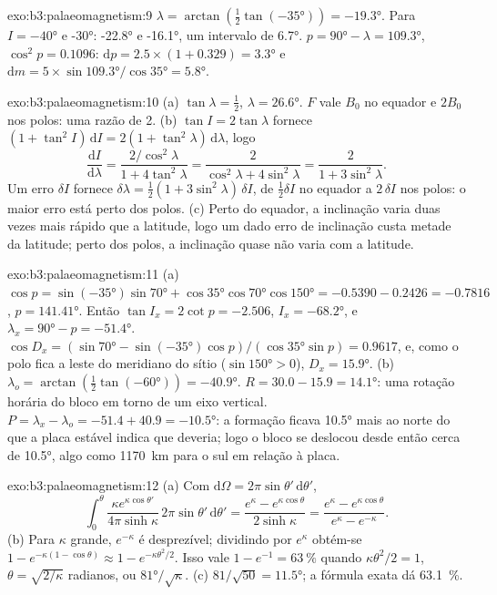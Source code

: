 \begin{solution}{exo:b3:palaeomagnetism:9}
$\lambda = \arctan(\tfrac12\tan(\ang{-35})) = \ang{-19.3}$. Para $I = \ang{-40}$
e \ang{-30}: \ang{-22.8} e \ang{-16.1}, um intervalo de \ang{6.7}.
$p = \ang{90} - \lambda = \ang{109.3}$, $\cos^2p = 0.1096$:
$\mathrm dp = 2.5\times(1 + 0.329) = \ang{3.3}$ e $\mathrm dm =
5\times\sin\ang{109.3}/\cos\ang{35} = \ang{5.8}$.
\end{solution}

\begin{solution}{exo:b3:palaeomagnetism:10}
(a) $\tan\lambda = \tfrac12$, $\lambda = \ang{26.6}$. $F$ vale $B_0$ no
equador e $2B_0$ nos polos: uma razão de 2. (b) $\tan I = 2\tan\lambda$
fornece $(1 + \tan^2I)\,\mathrm dI = 2(1 + \tan^2\lambda)\,\mathrm d\lambda$, logo
\[
  \frac{\mathrm dI}{\mathrm d\lambda} = \frac{2/\cos^2\lambda}{1 + 4\tan^2\lambda}
  = \frac{2}{\cos^2\lambda + 4\sin^2\lambda} = \frac{2}{1 + 3\sin^2\lambda}.
\]
Um erro $\delta I$ fornece $\delta\lambda = \tfrac12(1 + 3\sin^2\lambda)\,\delta I$,
de $\tfrac12\delta I$ no equador a $2\,\delta I$ nos polos: o
maior erro está perto dos polos. (c) Perto do equador, a inclinação varia
duas vezes mais rápido que a latitude, logo um dado erro de inclinação custa metade
da latitude; perto dos polos, a inclinação quase não varia com a latitude.
\end{solution}

\begin{solution}{exo:b3:palaeomagnetism:11}
(a) $\cos p = \sin(\ang{-35})\sin\ang{70} + \cos\ang{35}\cos\ang{70}\cos\ang{150}
= -0.5390 - 0.2426 = -0.7816$, $p = \ang{141.41}$. Então $\tan I_x = 2\cot p =
-2.506$, $I_x = \ang{-68.2}$, e $\lambda_x = \ang{90} - p = \ang{-51.4}$.
$\cos D_x = (\sin\ang{70} - \sin(\ang{-35})\cos p)/(\cos\ang{35}\sin p) =
0.9617$, e, como o polo fica a leste do meridiano do sítio ($\sin\ang{150} >
0$), $D_x = \ang{15.9}$. (b) $\lambda_o = \arctan(\tfrac12\tan(\ang{-60})) =
\ang{-40.9}$. $R = 30.0 - 15.9 = \ang{14.1}$: uma rotação horária do bloco
em torno de um eixo vertical. $P = \lambda_x - \lambda_o = -51.4 + 40.9 =
\ang{-10.5}$: a formação ficava \ang{10.5} mais ao norte do que a placa estável
indica que deveria; logo o bloco se deslocou desde então cerca de \ang{10.5}, algo como
\qty{1170}{km} para o sul em relação à placa.
\end{solution}

\begin{solution}{exo:b3:palaeomagnetism:12}
(a) Com $\mathrm d\Omega = 2\pi\sin\theta'\,\mathrm d\theta'$,
\[
  \int_0^\theta\frac{\kappa e^{\kappa\cos\theta'}}{4\pi\sinh\kappa}\,2\pi\sin\theta'\,
  \mathrm d\theta' = \frac{e^\kappa - e^{\kappa\cos\theta}}{2\sinh\kappa}
  = \frac{e^\kappa - e^{\kappa\cos\theta}}{e^\kappa - e^{-\kappa}} .
\]
(b) Para $\kappa$ grande, $e^{-\kappa}$ é desprezível; dividindo por $e^\kappa$
obtém-se $1 - e^{-\kappa(1 - \cos\theta)} \approx 1 - e^{-\kappa\theta^2/2}$. Isso
vale $1 - e^{-1} = \qty{63}{\percent}$ quando $\kappa\theta^2/2 = 1$, $\theta =
\sqrt{2/\kappa}$ radianos, ou $\ang{81}/\sqrt\kappa$. (c) $81/\sqrt{50} =
\ang{11.5}$; a fórmula exata dá \qty{63.1}{\percent}.
\end{solution}

